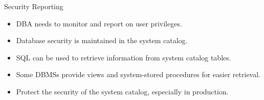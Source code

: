 \documentclass[aspectratio=169]{beamer}
\begin{document}
%
%

\begin{frame}{Security Reporting}
    \begin{itemize}
        \item DBA needs to monitor and report on user privileges.
        \item Database security is maintained in the system catalog.
        \item SQL can be used to retrieve information from system catalog tables.
        \item Some DBMSs provide views and system-stored procedures for easier retrieval.
        \item Protect the security of the system catalog, especially in production.
    \end{itemize}
\end{frame}
\end{document}
